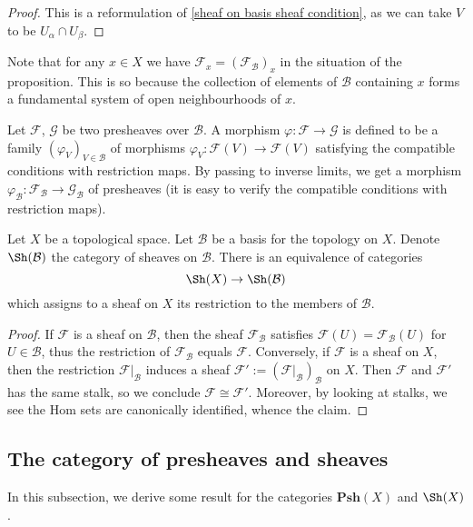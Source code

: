 \begin{proof}
This is a reformulation of \cref{sheaf on basis sheaf condition}, as we can take $V$ to be $U_\alpha\cap U_\beta$.
\end{proof}
Note that for any $x\in X$ we have $\mathscr{F}_x=(\mathscr{F}_{\mathcal{B}})_x$ in the situation of the proposition. This is so because the collection of elements of $\mathcal{B}$ containing $x$ forms a fundamental system of open neighbourhoods of $x$.\par
Let $\mathscr{F}$, $\mathscr{G}$ be two presheaves over $\mathcal{B}$. A morphism $\varphi:\mathscr{F}\to\mathscr{G}$ is defined to be a family $(\varphi_V)_{V\in\mathcal{B}}$ of morphisms $\varphi_V:\mathscr{F}(V)\to\mathscr{F}(V)$ satisfying the compatible conditions with restriction maps. By passing to inverse limits, we get a morphism $\varphi_{\mathcal{B}}:\mathscr{F}_{\mathcal{B}}\to\mathscr{G}_{\mathcal{B}}$ of presheaves (it is easy to verify the compatible conditions with restriction maps).
\begin{theorem}
Let $X$ be a topological space. Let $\mathcal{B}$ be a basis for the topology on $X$. Denote $\Sh(\mathcal{B})$ the category of sheaves on $\mathcal{B}$. There is an equivalence of categories
\[\Sh(X)\to\Sh(\mathcal{B})\]
which assigns to a sheaf on $X$ its restriction to the members of $\mathcal{B}$.
\end{theorem}
\begin{proof}
If $\mathscr{F}$ is a sheaf on $\mathcal{B}$, then the sheaf $\mathscr{F}_{\mathcal{B}}$ satisfies $\mathscr{F}(U)=\mathscr{F}_{\mathcal{B}}(U)$ for $U\in\mathcal{B}$, thus the restriction of $\mathscr{F}_{\mathcal{B}}$ equals $\mathscr{F}$. Conversely, if $\mathscr{F}$ is a sheaf on $X$, then the restriction $\mathscr{F}|_{\mathcal{B}}$ induces a sheaf $\mathscr{F}':=(\mathscr{F}|_{\mathcal{B}})_{\mathcal{B}}$ on $X$. Then $\mathscr{F}$ and $\mathscr{F}'$ has the same stalk, so we conclude $\mathscr{F}\cong\mathscr{F}'$. Moreover, by looking at stalks, we see the Hom sets are canonically identified, whence the claim.
\end{proof}
\subsection{The category of presheaves and sheaves}
In this subsection, we derive some result for the categories $\mathbf{Psh}(X)$ and $\Sh(X)$.

